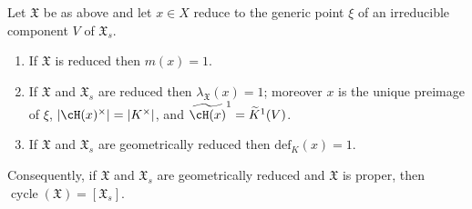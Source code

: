 \begin{proposition}
\label{prop:ch17-defect-reduced}
Let $\mathfrak X$ be as above and let $x\in X$ reduce to the generic
point $\xi$ of an irreducible component $V$ of $\mathfrak X_s$.
\begin{enumerate}
\item\label{itm:ch17-def:m}
 If $\mathfrak X$ is reduced then $m(x)=1$.
\item\label{itm:ch17-def:lambda}
 If $\mathfrak X$ and $\mathfrak X_s$ are reduced then
 $\lambda_{\mathfrak X}(x)=1$; moreover $x$ is the unique preimage of
 $\xi$, $|\cH(x)^\times|=|K^\times|$, and
 $\widetilde{\cH(x)}^1=\widetilde K^1(V)$.
\item\label{itm:ch17-def:def}
 If $\mathfrak X$ and $\mathfrak X_s$ are geometrically reduced then
 $\mathrm{def}_K(x)=1$.
\end{enumerate}
Consequently, if $\mathfrak X$ and $\mathfrak X_s$ are geometrically
reduced and $\mathfrak X$ is proper, then
$\operatorname{cycle}(\mathfrak X)=[\mathfrak X_s]$.
\end{proposition}

